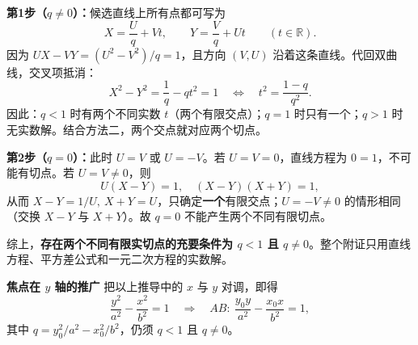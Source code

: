 \begin{proofbox}
\textbf{第1步（$q\ne0$）：}候选直线上所有点都可写为
\[
X=\frac{U}{q}+Vt,\qquad Y=\frac{V}{q}+Ut\qquad(t\in\mathbb R).
\]
因为 $UX-VY=(U^2-V^2)/q=1$，且方向 $(V,U)$ 沿着这条直线。代回双曲线，交叉项抵消：
\[
X^2-Y^2=\frac{1}{q}-qt^2=1
\quad\Longleftrightarrow\quad
\boxed{t^2=\frac{1-q}{q^2}}.
\]
因此：$q<1$ 时有两个不同实数 $t$（两个有限交点）；$q=1$ 时只有一个；$q>1$ 时无实数解。结合方法二，两个交点就对应两个切点。

\textbf{第2步（$q=0$）：}此时 $U=V$ 或 $U=-V$。若 $U=V=0$，直线方程为 $0=1$，不可能有切点。若 $U=V\ne0$，则
\[U(X-Y)=1,\quad (X-Y)(X+Y)=1,\]
从而 $X-Y=1/U,\ X+Y=U$，只确定\textbf{一个}有限交点；$U=-V\ne0$ 的情形相同（交换 $X-Y$ 与 $X+Y$）。故 $q=0$ 不能产生两个不同有限切点。

综上，\textbf{存在两个不同有限实切点的充要条件为 $q<1$ 且 $q\ne0$}。整个附证只用直线方程、平方差公式和一元二次方程的实数解。

\medskip
\textbf{\textcolor{CProof}{焦点在 $y$ 轴的推广}}
把以上推导中的 $x$ 与 $y$ 对调，即得
\[
\frac{y^2}{a^2}-\frac{x^2}{b^2}=1
\quad\Longrightarrow\quad
\boxed{AB:\ \frac{y_0y}{a^2}-\frac{x_0x}{b^2}=1},
\]
其中 $q=y_0^2/a^2-x_0^2/b^2$，仍须 $q<1$ 且 $q\ne0$。
\end{proofbox}
